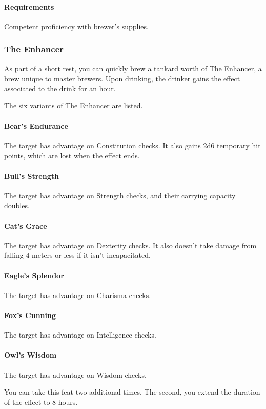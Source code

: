         \paragraph{Requirements} Competent proficiency with brewer's supplies.
    \subsubsection{The Enhancer} \label{feat::theenhancer}
        As part of a short rest, you can quickly brew a tankard worth of The Enhancer, a brew unique to master brewers.
        Upon drinking, the drinker gains the effect associated to the drink for an hour.

        The six variants of The Enhancer are listed.
        \paragraph{Bear's Endurance} The target has advantage on Constitution checks.
        It also gains 2d6 temporary hit points, which are lost when the effect ends.
        \paragraph{Bull's Strength} The target has advantage on Strength checks, and their carrying capacity doubles.
        \paragraph{Cat's Grace} The target has advantage on Dexterity checks.
        It also doesn't take damage from falling 4 meters or less if it isn't incapacitated.
        \paragraph{Eagle's Splendor} The target has advantage on Charisma checks.
        \paragraph{Fox's Cunning} The target has advantage on Intelligence checks.
        \paragraph{Owl's Wisdom} The target has advantage on Wisdom checks.

        You can take this feat two additional times.
        The second, you extend the duration of the effect to 8 hours.

